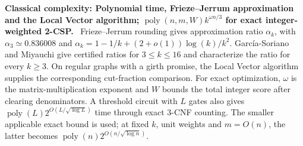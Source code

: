 \documentclass[11pt,a4paper]{article}
\theoremstyle{problemstyle}
\newcommand{\complexity}[2]{\par\noindent\textbf{\boldmath #1 complexity: #2}\ }
\begin{document}
\complexity{Classical}{Polynomial time, Frieze--Jerrum approximation and the Local Vector algorithm; $\operatorname{poly}(n,m,W)k^{\omega n/3}$ for exact integer-weighted 2-CSP.}
Frieze--Jerrum rounding gives approximation ratio $\alpha_k$, with $\alpha_3\simeq0.836008$ and $\alpha_k=1-1/k+(2+o(1))\log(k)/k^2$. Garc\'ia-Soriano and Miyauchi give certified ratios for $3\le k\le16$ and characterize the ratio for every $k\ge3$. On regular graphs with a girth promise, the Local Vector algorithm supplies the corresponding cut-fraction comparison. For exact optimization, $\omega$ is the matrix-multiplication exponent and $W$ bounds the total integer score after clearing denominators. A threshold circuit with $L$ gates also gives $\operatorname{poly}(L)2^{O(L/\sqrt{\log L})}$ time through exact 3-CNF counting. The smaller applicable exact bound is used; at fixed $k$, unit weights and $m=O(n)$, the latter becomes $\operatorname{poly}(n)2^{O(n/\sqrt{\log n})}$.
\end{document}
